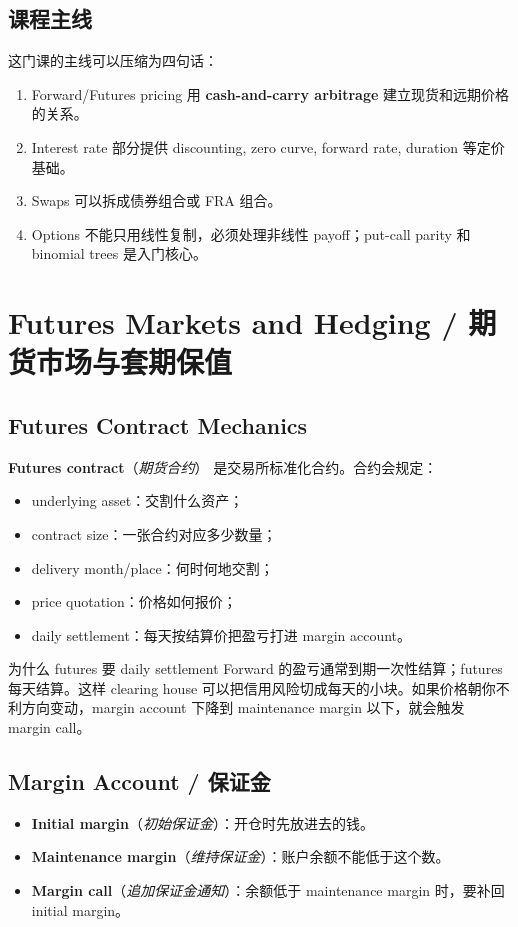 \documentclass[11pt,a4paper,openany]{ctexbook}
\newcommand{\term}[2]{\textbf{#1}（\emph{#2}）}
\newcommand{\important}[1]{\textcolor{mainteal}{\textbf{#1}}}
\newcommand{\source}[1]{\par\smallskip\noindent{\small\textcolor{muted}{Source: #1}}\par}
\begin{document}
\section{课程主线}
这门课的主线可以压缩为四句话：
\begin{enumerate}
  \item Forward/Futures pricing 用 \important{cash-and-carry arbitrage} 建立现货和远期价格的关系。
  \item Interest rate 部分提供 discounting, zero curve, forward rate, duration 等定价基础。
  \item Swaps 可以拆成债券组合或 FRA 组合。
  \item Options 不能只用线性复制，必须处理非线性 payoff；put-call parity 和 binomial trees 是入门核心。
\end{enumerate}

\chapter{Futures Markets and Hedging / 期货市场与套期保值}
\source{Lecture 2; Assignment 1}

\section{Futures Contract Mechanics}
\term{Futures contract}{期货合约} 是交易所标准化合约。合约会规定：
\begin{itemize}
  \item underlying asset：交割什么资产；
  \item contract size：一张合约对应多少数量；
  \item delivery month/place：何时何地交割；
  \item price quotation：价格如何报价；
  \item daily settlement：每天按结算价把盈亏打进 margin account。
\end{itemize}

\begin{intuitionbox}{为什么 futures 要 daily settlement}
Forward 的盈亏通常到期一次性结算；futures 每天结算。这样 clearing house 可以把信用风险切成每天的小块。如果价格朝你不利方向变动，margin account 下降到 maintenance margin 以下，就会触发 margin call。
\end{intuitionbox}

\section{Margin Account / 保证金}
\begin{itemize}
  \item \term{Initial margin}{初始保证金}：开仓时先放进去的钱。
  \item \term{Maintenance margin}{维持保证金}：账户余额不能低于这个数。
  \item \term{Margin call}{追加保证金通知}：余额低于 maintenance margin 时，要补回 initial margin。
\end{itemize}
\end{document}
